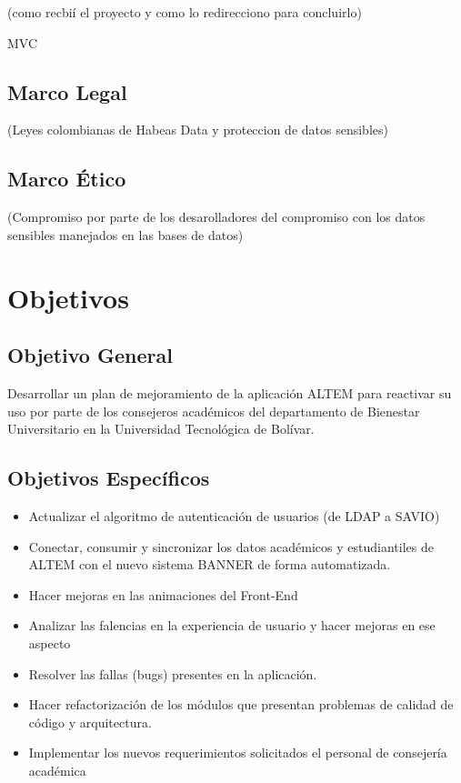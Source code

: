 (como recbií el proyecto y como lo redirecciono para concluirlo)

MVC 


\subsection{Marco Legal}
(Leyes colombianas de Habeas Data y proteccion de datos sensibles)
\subsection{Marco Ético}
(Compromiso por parte de los desarolladores del compromiso con los datos sensibles manejados en las bases de datos)
\section{Objetivos}

\subsection{Objetivo General}
Desarrollar un plan de mejoramiento de la aplicación ALTEM para reactivar su uso por parte de los consejeros académicos del departamento de Bienestar Universitario en la Universidad Tecnológica de Bolívar.

\subsection{Objetivos Específicos}
\begin{itemize}
    \item Actualizar el algoritmo de autenticación de usuarios (de LDAP a SAVIO)
    \item Conectar, consumir y sincronizar los datos académicos y estudiantiles de ALTEM con el nuevo sistema BANNER de forma automatizada.
    \item Hacer mejoras en las animaciones del Front-End
    \item Analizar las falencias en la experiencia de usuario y hacer mejoras en ese aspecto
    \item Resolver las fallas (bugs) presentes en la aplicación.
    \item Hacer refactorización de los módulos que presentan problemas de calidad de código y arquitectura.
    \item Implementar los nuevos requerimientos solicitados el personal de consejería académica
\end{itemize}